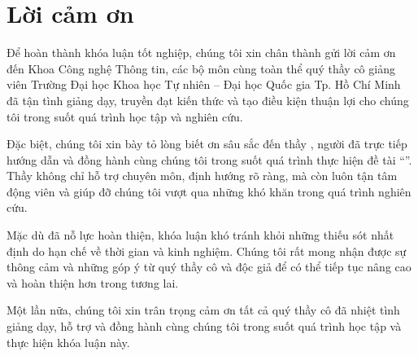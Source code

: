 \chapter*{Lời cảm ơn}

Để hoàn thành khóa luận tốt nghiệp, chúng tôi xin chân thành gửi lời cảm ơn đến Khoa Công nghệ Thông tin, các bộ môn cùng toàn thể quý thầy cô giảng viên Trường Đại học Khoa học Tự nhiên -- Đại học Quốc gia Tp. Hồ Chí Minh 
đã tận tình giảng dạy, truyền đạt kiến thức và tạo điều kiện thuận lợi cho chúng tôi trong suốt quá trình học tập và nghiên cứu.

Đặc biệt, chúng tôi xin bày tỏ lòng biết ơn sâu sắc đến thầy \advisorname, người đã trực tiếp hướng dẫn và đồng hành cùng chúng tôi trong suốt quá trình thực hiện đề tài ``\thesisname''. 
Thầy không chỉ hỗ trợ chuyên môn, định hướng rõ ràng, mà còn luôn tận tâm động viên và giúp đỡ chúng tôi vượt qua những khó khăn trong quá trình nghiên cứu.

Mặc dù đã nỗ lực hoàn thiện, khóa luận khó tránh khỏi những thiếu sót nhất định do hạn chế về thời gian và kinh nghiệm. Chúng tôi rất mong nhận được sự thông cảm và những góp ý từ quý thầy cô và độc giả để có thể tiếp tục nâng cao và hoàn thiện hơn trong tương lai.

Một lần nữa, chúng tôi xin trân trọng cảm ơn tất cả quý thầy cô đã nhiệt tình giảng dạy, hỗ trợ và đồng hành cùng chúng tôi trong suốt quá trình học tập và thực hiện khóa luận này.